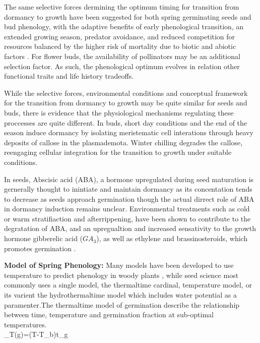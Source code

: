 \documentclass{article}\usepackage[]{graphicx}\usepackage[]{color}
\begin{document}
\par The same selective forces dermining the optimum timing for transition from dormancy to growth have been suggested for both spring germinating seeds and bud phenology, with the adaptive benefits of early phenological transition, an extended growing season, predator avoidance, and reduced competition for resources balanced by the higher risk of mortality due to biotic and abiotic factors \citep{Rathcke1985}. For flower buds, the availability of pollinators may be an additional selection factor. As such, the phenological optimum evolves in relation other functional traits and life history tradeoffs. 
\par While the selective forces, environmental conditions and conceptual framework for the transition from dormancy to growth may be quite similar for seeds and buds, there is evidence that the physiological mechanisms regulating these proccesses are quite different. In buds, short day conditions and the end of the season induce dormancy by isolating meristematic cell interations through heavy deposits of callose in the plasmademota\citep{Rinne2011,Sager2014}. Winter chilling degrades the callose, reengaging cellular integration for the transition to growth under suitable conditions. 
\par In seeds, Abscisic acid (ABA), a hormone upregulated during seed maturation is gernerally thought to inintiate and maintain dormancy as its concentation tends to decrease as seeds approach germination  though the actual dirrect role of ABA in dormancy induction remains unclear. Environmental treatments such as cold or warm stratifiaction and afterrippening, have been shown to contribute to the degratation of ABA, and an upregualtion and increased sensativity to the growth hormone gibberelic acid ($GA_3$), as well as ethylene and brassinosteroids, which promotes germination \citep{Kucera2005}.

\textbf{Model of Spring Phenology:} Many models have been developed to use temperature to predict phenology in woody plants \citep{Chuine2002}, while seed science most commonly uses a single model, the thermaltime cardinal, temperature model, or its varient the hydrothermaltime model which includes water potential as a paramenter\citep{Bradford2002}.The thermaltime model of germination describe the relationship between time, temperature and germination fraction at sub-optimal temperatures.\\

\theta_{T}(g)=(T-T_{b})t_{g}\\
\end{document}
